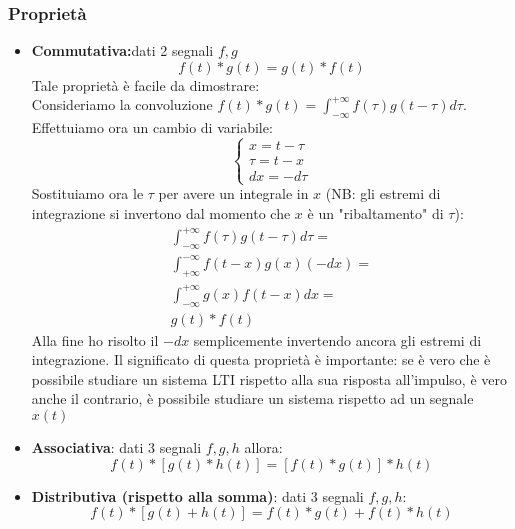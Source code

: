 \subsubsection{Proprietà}
\begin{itemize}
    \item \textbf{Commutativa:}dati 2 segnali $f,g$
    \begin{equation} \label{prop: convComm}
        f(t) \ast g(t) = g(t) \ast f(t)
    \end{equation}
    Tale proprietà è facile da dimostrare:\\
    Consideriamo la convoluzione $f(t) \ast g(t) = \int_{-\infty}^{+\infty} f(\tau)g(t - \tau) d\tau$. Effettuiamo ora un cambio di variabile:
    \begin{equation*}
        \begin{cases}
            x = t - \tau\\
            \tau = t - x\\
            dx = -d\tau
        \end{cases}
    \end{equation*}
    Sostituiamo ora le $\tau$ per avere un integrale in $x$ (NB: gli estremi di integrazione si invertono dal momento che $x$ è un "ribaltamento" di $\tau$):
    \begin{align*}
        \int_{-\infty}^{+\infty} f(\tau)g(t - \tau) d\tau= \\
        \int_{+\infty}^{-\infty} f(t - x)g(x) (-dx) = \\
        \int_{-\infty}^{+\infty} g(x)f(t - x) dx = \\
        g(t) \ast f(t)
    \end{align*}
    Alla fine ho risolto il $-dx$ semplicemente invertendo ancora gli estremi di integrazione. Il significato di questa proprietà è importante:
    se è vero che è possibile studiare un sistema LTI rispetto alla sua risposta all'impulso, è vero anche il contrario, è possibile studiare un sistema rispetto ad un segnale $x(t)$
    \item \textbf{Associativa}: dati 3 segnali $f,g,h$ allora:
    \begin{equation}
        f(t) \ast [g(t) \ast h(t)] = [f(t) \ast g(t)] \ast h(t)
    \end{equation}

    \item \textbf{Distributiva (rispetto alla somma)}: dati 3 segnali $f,g,h$: \label{prop: ConvDistr}
    \begin{equation}
        f(t) \ast [g(t) + h(t)] = f(t) \ast g(t) + f(t) \ast h(t) 
    \end{equation}


\end{itemize}
